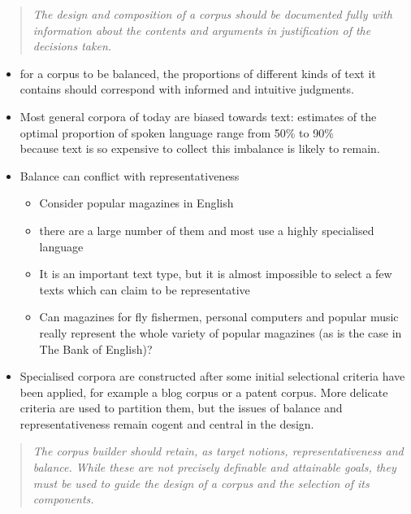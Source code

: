 \documentclass[a4paper,landscape,headrule,footrule,dvips]{foils}
\begin{document}
\begin{CJK}{UTF8}{min}
\begin{quotation}
  \textit{The design and composition of a corpus should be documented fully
  with information about the contents and arguments in justification
  of the decisions taken.}
\end{quotation}


\begin{itemize}
\item for a corpus to be  balanced, the proportions of different kinds of text it contains should correspond with informed and intuitive judgments.
\item Most general corpora of today are biased towards text: estimates of the optimal proportion of spoken language range from 50\% to 90\%
\\ because text is so expensive to collect this imbalance is likely to remain.
\item Balance can conflict with representativeness
  \begin{itemize}
  \item Consider popular magazines in English
  \item  there are a large number of them and most use a highly specialised language
  \item It is an important text type, but it is almost impossible to select a few texts which can claim to be representative
  \item Can magazines for fly fishermen, personal computers and popular music really represent the whole variety of popular magazines (as is the case in The Bank of English)?
  \end{itemize}
\item Specialised corpora are constructed after some initial
  selectional criteria have been applied, for example a blog corpus or
  a patent corpus. More delicate criteria are used to partition them,
  but the issues of balance and representativeness remain cogent and
  central in the design.
\end{itemize}

\begin{quotation}
  \textit{The corpus builder should retain, as target notions,
    representativeness and balance. While these are not precisely
    definable and attainable goals, they must be used to guide the
    design of a corpus and the selection of its components.}
\end{quotation}



\end{CJK}
\end{document}
